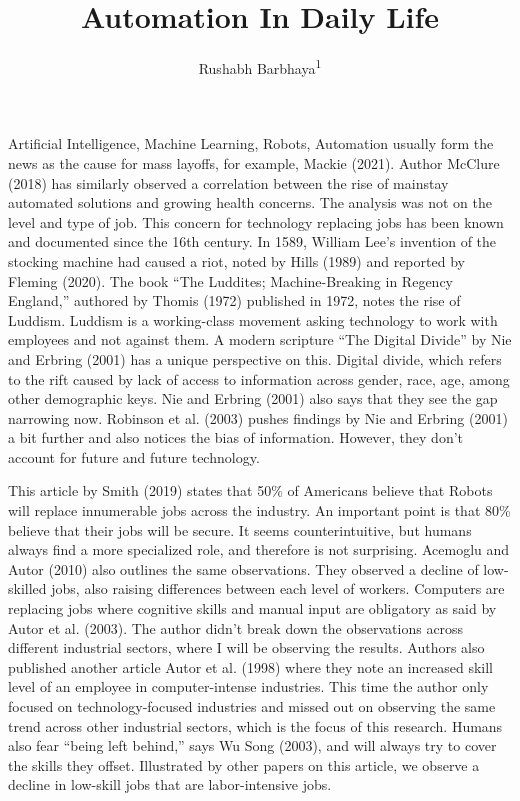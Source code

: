 \documentclass[
  english,
  man]{apa7}
\title{Automation In Daily Life}
\author{Rushabh Barbhaya\textsuperscript{1}}
\date{}
\affiliation{\vspace{0.5cm}\textsuperscript{1} Harrisburg University of Science and Technology}
\begin{document}
\maketitle

Artificial Intelligence, Machine Learning, Robots, Automation usually form the news as the cause for mass layoffs, for example, Mackie (2021). Author McClure (2018) has similarly observed a correlation between the rise of mainstay automated solutions and growing health concerns. The analysis was not on the level and type of job. This concern for technology replacing jobs has been known and documented since the 16th century. In 1589, William Lee's invention of the stocking machine had caused a riot, noted by Hills (1989) and reported by Fleming (2020). The book ``The Luddites; Machine-Breaking in Regency England,'' authored by Thomis (1972) published in 1972, notes the rise of Luddism. Luddism is a working-class movement asking technology to work with employees and not against them. A modern scripture ``The Digital Divide'' by Nie and Erbring (2001) has a unique perspective on this. Digital divide, which refers to the rift caused by lack of access to information across gender, race, age, among other demographic keys. Nie and Erbring (2001) also says that they see the gap narrowing now. Robinson et al. (2003) pushes findings by Nie and Erbring (2001) a bit further and also notices the bias of information. However, they don't account for future and future technology.

This article by Smith (2019) states that 50\% of Americans believe that Robots will replace innumerable jobs across the industry. An important point is that 80\% believe that their jobs will be secure. It seems counterintuitive, but humans always find a more specialized role, and therefore is not surprising. Acemoglu and Autor (2010) also outlines the same observations. They observed a decline of low-skilled jobs, also raising differences between each level of workers. Computers are replacing jobs where cognitive skills and manual input are obligatory as said by Autor et al. (2003). The author didn't break down the observations across different industrial sectors, where I will be observing the results. Authors also published another article Autor et al. (1998) where they note an increased skill level of an employee in computer-intense industries. This time the author only focused on technology-focused industries and missed out on observing the same trend across other industrial sectors, which is the focus of this research. Humans also fear ``being left behind,'' says Wu Song (2003), and will always try to cover the skills they offset. Illustrated by other papers on this article, we observe a decline in low-skill jobs that are labor-intensive jobs.
\end{document}
